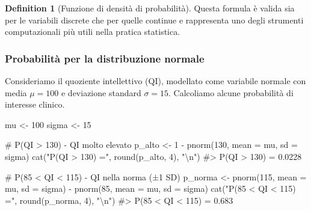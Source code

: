 \documentclass[
  letterpaper,
  DIV=11,
  numbers=noendperiod,
  oneside]{scrreprt}
\newenvironment{Shaded}{\begin{snugshade}}{\end{snugshade}}
\newcommand{\AttributeTok}[1]{\textcolor[rgb]{0.40,0.45,0.13}{#1}}
\newcommand{\CommentTok}[1]{\textcolor[rgb]{0.37,0.37,0.37}{#1}}
\newcommand{\DecValTok}[1]{\textcolor[rgb]{0.68,0.00,0.00}{#1}}
\newcommand{\FunctionTok}[1]{\textcolor[rgb]{0.28,0.35,0.67}{#1}}
\newcommand{\NormalTok}[1]{\textcolor[rgb]{0.00,0.23,0.31}{#1}}
\newcommand{\OtherTok}[1]{\textcolor[rgb]{0.00,0.23,0.31}{#1}}
\newcommand{\SpecialCharTok}[1]{\textcolor[rgb]{0.37,0.37,0.37}{#1}}
\newcommand{\StringTok}[1]{\textcolor[rgb]{0.13,0.47,0.30}{#1}}
\theoremstyle{definition}
\theoremstyle{plain}
\theoremstyle{definition}
\newtheorem{definition}{Definition}[chapter]
\theoremstyle{remark}
\begin{document}
\begin{definition}[Funzione di densità di
probabilità]
Questa formula è valida sia per le variabili discrete che per quelle
continue e rappresenta uno degli strumenti computazionali più utili
nella pratica statistica.

\begin{tcolorbox}[enhanced jigsaw, arc=.35mm, breakable, colbacktitle=quarto-callout-note-color!10!white, opacityback=0, toprule=.15mm, rightrule=.15mm, colback=white, opacitybacktitle=0.6, leftrule=.75mm, coltitle=black, bottomtitle=1mm, left=2mm, toptitle=1mm, title=\textcolor{quarto-callout-note-color}{\faInfo}\hspace{0.5em}{Esempio: Calcoli con la CDF normale}, titlerule=0mm, bottomrule=.15mm, colframe=quarto-callout-note-color-frame]

\subsubsection*{Probabilità per la distribuzione
normale}\label{probabilituxe0-per-la-distribuzione-normale}

Consideriamo il quoziente intellettivo (QI), modellato come variabile
normale con media \(\mu = 100\) e deviazione standard \(\sigma = 15\).
Calcoliamo alcune probabilità di interesse clinico.

\begin{Shaded}
\begin{Highlighting}[]
\NormalTok{mu }\OtherTok{\textless{}{-}} \DecValTok{100}
\NormalTok{sigma }\OtherTok{\textless{}{-}} \DecValTok{15}

\CommentTok{\# P(QI \textgreater{} 130) {-} QI molto elevato}
\NormalTok{p\_alto }\OtherTok{\textless{}{-}} \DecValTok{1} \SpecialCharTok{{-}} \FunctionTok{pnorm}\NormalTok{(}\DecValTok{130}\NormalTok{, }\AttributeTok{mean =}\NormalTok{ mu, }\AttributeTok{sd =}\NormalTok{ sigma)}
\FunctionTok{cat}\NormalTok{(}\StringTok{"P(QI \textgreater{} 130) ="}\NormalTok{, }\FunctionTok{round}\NormalTok{(p\_alto, }\DecValTok{4}\NormalTok{), }\StringTok{"}\SpecialCharTok{\textbackslash{}n}\StringTok{"}\NormalTok{)}
\CommentTok{\#\textgreater{} P(QI \textgreater{} 130) = 0.0228}

\CommentTok{\# P(85 \textless{} QI \textless{} 115) {-} QI nella norma (±1 SD)}
\NormalTok{p\_norma }\OtherTok{\textless{}{-}} \FunctionTok{pnorm}\NormalTok{(}\DecValTok{115}\NormalTok{, }\AttributeTok{mean =}\NormalTok{ mu, }\AttributeTok{sd =}\NormalTok{ sigma) }\SpecialCharTok{{-}} \FunctionTok{pnorm}\NormalTok{(}\DecValTok{85}\NormalTok{, }\AttributeTok{mean =}\NormalTok{ mu, }\AttributeTok{sd =}\NormalTok{ sigma)}
\FunctionTok{cat}\NormalTok{(}\StringTok{"P(85 \textless{} QI \textless{} 115) ="}\NormalTok{, }\FunctionTok{round}\NormalTok{(p\_norma, }\DecValTok{4}\NormalTok{), }\StringTok{"}\SpecialCharTok{\textbackslash{}n}\StringTok{"}\NormalTok{)}
\CommentTok{\#\textgreater{} P(85 \textless{} QI \textless{} 115) = 0.683}


\end{Highlighting}
\end{Shaded}
\end{tcolorbox}
\end{definition}
\end{document}
